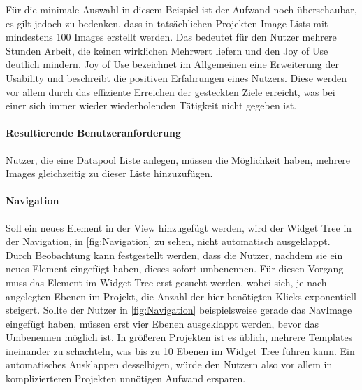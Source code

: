 Für die minimale Auswahl in diesem Beispiel ist der Aufwand noch überschaubar, es gilt jedoch zu bedenken, dass in tatsächlichen Projekten Image Lists mit mindestens 100 Images erstellt werden.
Das bedeutet für den Nutzer mehrere Stunden Arbeit, die keinen wirklichen Mehrwert liefern und den Joy of Use deutlich mindern.
Joy of Use bezeichnet im Allgemeinen eine Erweiterung der Usability und beschreibt die positiven Erfahrungen eines Nutzers.
Diese werden vor allem durch das effiziente Erreichen der gesteckten Ziele erreicht, was bei einer sich immer wieder wiederholenden Tätigkeit nicht gegeben ist.



\paragraph{Resultierende Benutzeranforderung}
Nutzer, die eine Datapool Liste anlegen, müssen die Möglichkeit haben, mehrere Images gleichzeitig zu dieser Liste hinzuzufügen.

\paragraph{Navigation}
Soll ein neues Element in der View hinzugefügt werden, wird der Widget Tree in der Navigation, in \cref{fig:Navigation} zu sehen, nicht automatisch ausgeklappt.
Durch Beobachtung kann festgestellt werden, dass die Nutzer, nachdem sie ein neues Element eingefügt haben, dieses sofort umbenennen. 
Für diesen Vorgang muss das Element im Widget Tree erst gesucht werden, wobei sich, je nach angelegten Ebenen im Projekt, die Anzahl der hier benötigten Klicks exponentiell steigert.
Sollte der Nutzer in \cref{fig:Navigation} beispielsweise gerade das NavImage eingefügt haben, müssen erst vier Ebenen ausgeklappt werden, bevor das Umbenennen möglich ist.
In größeren Projekten ist es üblich, mehrere Templates ineinander zu schachteln, was bis zu 10 Ebenen im Widget Tree führen kann.
Ein automatisches Ausklappen desselbigen, würde den Nutzern also vor allem in komplizierteren Projekten unnötigen Aufwand ersparen.

